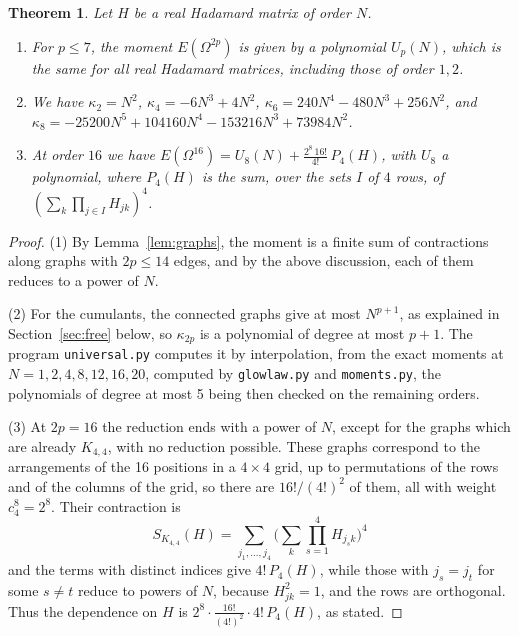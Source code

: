 \documentclass[11pt,a4paper]{article}
\newtheorem{thm}{Theorem}[section]
\theoremstyle{remark}
\begin{document}
\begin{samepage}
\begin{thm}\label{thm:moments}
Let $H$ be a real Hadamard matrix of order $N$.
\begin{enumerate}
\item For $p\leq7$, the moment $E(\Omega^{2p})$ is given by a polynomial $U_p(N)$, which is the same for all real Hadamard matrices, including those of order $1,2$.

\item We have $\kappa_2=N^2$, $\kappa_4=-6N^3+4N^2$, $\kappa_6=240N^4-480N^3+256N^2$, and $\kappa_8=-25200N^5+104160N^4-153216N^3+73984N^2$.

\item At order $16$ we have $E(\Omega^{16})=U_8(N)+\frac{2^8\,16!}{4!}\,P_4(H)$, with $U_8$ a polynomial, where $P_4(H)$ is the sum, over the sets $I$ of $4$ rows, of $(\sum_k\prod_{j\in I}H_{jk})^4$.
\end{enumerate}
\end{thm}
\end{samepage}

\begin{proof}
(1) By Lemma~\ref{lem:graphs}, the moment is a finite sum of contractions along graphs with $2p\leq14$ edges, and by the above discussion, each of them reduces to a power of $N$.

(2) For the cumulants, the connected graphs give at most $N^{p+1}$, as explained in Section~\ref{sec:free} below, so $\kappa_{2p}$ is a polynomial of degree at most $p+1$. The program \texttt{universal.py} computes it by interpolation, from the exact moments at $N=1,2,4,8,12,16,20$, computed by \texttt{glowlaw.py} and \texttt{moments.py}, the polynomials of degree at most 5 being then checked on the remaining orders.

(3) At $2p=16$ the reduction ends with a power of $N$, except for the graphs which are already $K_{4,4}$, with no reduction possible. These graphs correspond to the arrangements of the 16 positions in a $4\times4$ grid, up to permutations of the rows and of the columns of the grid, so there are $16!/(4!)^2$ of them, all with weight $c_4^8=2^8$. Their contraction is
\[
 S_{K_{4,4}}(H)=\sum_{j_1,\ldots,j_4}\Big(\sum_k\prod_{s=1}^4H_{j_sk}\Big)^4
\]
and the terms with distinct indices give $4!\,P_4(H)$, while those with $j_s=j_t$ for some $s\neq t$ reduce to powers of $N$, because $H_{jk}^2=1$, and the rows are orthogonal. Thus the dependence on $H$ is $2^8\cdot\frac{16!}{(4!)^2}\cdot4!\,P_4(H)$, as stated.
\end{proof}
\end{document}
